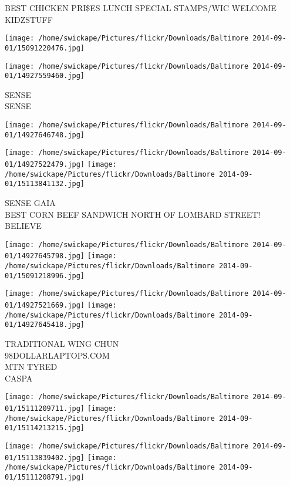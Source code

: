 \documentclass[10pt,letterpaper]{article}
\begin{document}
BEST CHICKEN PRI\$ES LUNCH SPECIAL STAMPS/WIC WELCOME\\
KIDZSTUFF
\pagebreak

\texttt{[image: /home/swickape/Pictures/flickr/Downloads/Baltimore 2014-09-01/15091220476.jpg]}

\vspace{0.25in}
\texttt{[image: /home/swickape/Pictures/flickr/Downloads/Baltimore 2014-09-01/14927559460.jpg]}

SENSE\\
SENSE
\pagebreak

\texttt{[image: /home/swickape/Pictures/flickr/Downloads/Baltimore 2014-09-01/14927646748.jpg]}

\vspace{0.25in}
\texttt{[image: /home/swickape/Pictures/flickr/Downloads/Baltimore 2014-09-01/14927522479.jpg]}
\texttt{[image: /home/swickape/Pictures/flickr/Downloads/Baltimore 2014-09-01/15113841132.jpg]}

SENSE GAIA\\
BEST CORN BEEF SANDWICH NORTH OF LOMBARD STREET!\\
BELIEVE
\pagebreak

\texttt{[image: /home/swickape/Pictures/flickr/Downloads/Baltimore 2014-09-01/14927645798.jpg]}
\texttt{[image: /home/swickape/Pictures/flickr/Downloads/Baltimore 2014-09-01/15091218996.jpg]}

\texttt{[image: /home/swickape/Pictures/flickr/Downloads/Baltimore 2014-09-01/14927521669.jpg]}
\texttt{[image: /home/swickape/Pictures/flickr/Downloads/Baltimore 2014-09-01/14927645418.jpg]}

TRADITIONAL WING CHUN\\
98DOLLARLAPTOPS.COM\\
MTN TYRED\\
CASPA
\pagebreak

\texttt{[image: /home/swickape/Pictures/flickr/Downloads/Baltimore 2014-09-01/15111209711.jpg]}
\texttt{[image: /home/swickape/Pictures/flickr/Downloads/Baltimore 2014-09-01/15114213215.jpg]}

\texttt{[image: /home/swickape/Pictures/flickr/Downloads/Baltimore 2014-09-01/15113839402.jpg]}
\texttt{[image: /home/swickape/Pictures/flickr/Downloads/Baltimore 2014-09-01/15111208791.jpg]}
\end{document}
